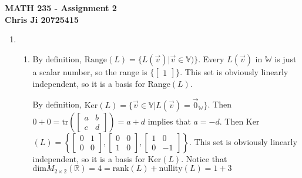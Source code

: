 \documentclass[10pt,english]{article}
\begin{document}
\noindent \begin{center}
\textbf{\large{}MATH 235 - Assignment 2}\\
\textbf{\large{}Chris Ji 20725415}
\par\end{center}{\large \par}
\medskip{}

\begin{enumerate}
\item \begin{enumerate}
    \item  By definition, $\text{Range}(L)=\{L(\vec{v})|\vec{v}\in\mathbb{V})\}$. Every $L(\vec{v})$ in $\mathbb{W}$ is just a scalar number, so the range is $\{\begin{bmatrix}1\end{bmatrix}\}$. This set is obviously linearly independent, so it is a basis for Range$(L)$. 
    
    By definition, $\text{Ker}(L)=\{\vec{v}\in\mathbb{V}|L(\vec{v})=\vec{0}_\mathbb{W}\}$. Then $0+0=\text{tr}\left(\begin{bmatrix}a&b\\c&d\end{bmatrix}\right)=a+d$ implies that $a=-d$. Then Ker$(L)=\left\{\begin{bmatrix}0&1\\0&0\end{bmatrix},\begin{bmatrix}0&0\\1&0\end{bmatrix},\begin{bmatrix}1&0\\0&-1\end{bmatrix}\right\}$. This set is obviously linearly independent, so it is a basis for Ker$(L)$. 
     Notice that $\text{dim}M_{2\times2}(\mathbb{R})=4=\text{rank}(L)+\text{nullity}(L)=1+3$
   
    
    

\end{enumerate}
\end{enumerate}
\end{document}

